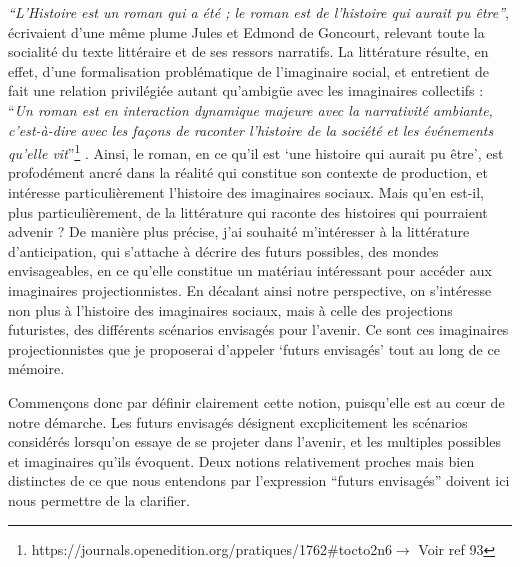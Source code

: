 \documentclass[letterpaper,portrait,12pt]{article}
\begin{document}
\textbf{	}\emph{{``}L'Histoire est un roman qui a \'{e}t\'{e} ; le roman est de l'histoire qui aurait pu \^{e}tre''}, \'{e}crivaient d'une m\^{e}me plume Jules et Edmond de Goncourt, relevant toute la socialit\'{e} du texte litt\'{e}raire et de ses ressors narratifs. La litt\'{e}rature r\'{e}sulte, en effet, d'une formalisation probl\'{e}matique de l'imaginaire social, et entretient de fait une relation privil\'{e}gi\'{e}e autant qu'ambig\"{u}e avec les imaginaires collectifs : {``}\emph{Un roman est en interaction dynamique majeure avec la narrativit\'{e} ambiante, c'est-\`{a}-dire avec les fa\c{c}ons de raconter l'histoire de la soci\'{e}t\'{e} et les \'{e}v\'{e}nements qu'elle vit}''\footnote{	https://journals.openedition.org/pratiques/1762\#tocto2n6$\rightarrow$ Voir ref 93}  . Ainsi, le roman, en ce qu'il est {`}une histoire qui aurait pu \^{e}tre', est profod\'{e}ment ancr\'{e} dans  la r\'{e}alit\'{e} qui constitue son contexte de production, et int\'{e}resse particuli\`{e}rement l'histoire des imaginaires sociaux. Mais qu'en est-il, plus particuli\`{e}rement, de la litt\'{e}rature qui raconte des histoires qui pourraient advenir ? De mani\`{e}re plus pr\'{e}cise, j'ai souhait\'{e} m'int\'{e}resser \`{a} la litt\'{e}rature d'anticipation, qui s'attache \`{a} d\'{e}crire des futurs possibles, des mondes envisageables, en ce qu'elle constitue un mat\'{e}riau int\'{e}ressant pour acc\'{e}der aux imaginaires projectionnistes. En d\'{e}calant ainsi notre perspective, on s'int\'{e}resse non plus \`{a} l'histoire des imaginaires sociaux, mais \`{a} celle des projections futuristes, des diff\'{e}rents sc\'{e}narios envisag\'{e}s pour l'avenir.  Ce sont ces imaginaires projectionnistes que je proposerai d'appeler {`}futurs envisag\'{e}s' tout au long de ce m\'{e}moire. 





	Commen\c{c}ons donc par d\'{e}finir clairement cette notion, puisqu'elle est au c\oe{}ur de notre d\'{e}marche. Les futurs envisag\'{e}s d\'{e}signent excplicitement les sc\'{e}narios consid\'{e}r\'{e}s lorsqu'on essaye de se projeter dans l'avenir, et les multiples possibles et imaginaires qu'ils \'{e}voquent. Deux notions relativement proches mais bien distinctes de ce que nous entendons par l'expression {``}futurs envisag\'{e}s'' doivent ici nous permettre de la clarifier.
\end{document}
